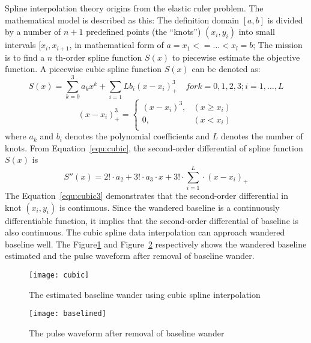Spline interpolation theory origins from the elastic ruler problem.
The mathematical model is described as this: The definition domain
$[a, b]$ is divided by a number of $n+1$ predefined points (the
``knots'') $(x_i, y_i)$ into small intervals $[x_i, x_{i+1}$, in
mathematical form of
$a=x_1<=\ldots<x_l=b$; The mission is to find a $n$ th-order spline
function $S(x)$ to piecewise estimate the objective function. A
piecewise cubic spline function $S(x)$ can be denoted as:
\begin{equation}
    S(x)=\sum_{k=0}^{3} a_k x^k + \sum_{i=1}{L} b_i
    (x-x_i)_{+}^{3} \quad for k=0,1,2,3; i=1,\ldots,L 
    \label{equ:cubic}
\end{equation}
\begin{equation}
    (x-x_i)_{+}^{3} = \left\{
    \begin{array}{ll}
        (x-x_i)^3, & (x \geq x_i)\\
        0, & (x<x_i)\\
    \end{array} \right.
    \label{equ:cubic2}
\end{equation}
where $a_k$ and $b_i$ denotes the polynomial coefficients and $L$
denotes the number of knots. From Equation~\ref{equ:cubic}, the
second-order differential of spline function $S(x)$ is 
\begin{equation}
    S''(x) = 2! \cdot a_2 + 3! \cdot a_3 \cdot x + 3! \cdot
    \sum_{i=1}^{L} \cdot (x-x_i)_{+}
    \label{equ:cubic3}
\end{equation}
The Equation~\ref{equ:cubic3} demonstrates that the second-order
differential in knot $(x_i, y_i)$ is continuous. Since the wandered baseline
is a continuously differentiable function, it implies that the
second-order differential of baseline is also continuous. The cubic
spline data interpolation can approach wandered baseline well. 
The Figure\ref{fig:estbaseline} and Figure~\ref{fig:baselined} respectively shows the wandered
baseline estimated and the pulse waveform after removal of baseline wander.
\begin{figure}[htpb]
    \begin{center}
        \texttt{[image: cubic]}
    \end{center}
    \caption{The estimated baseline wander using cubic spline interpolation}
    \label{fig:estbaseline}
\end{figure}
\begin{figure}[htpb]
    \begin{center}
        \texttt{[image: baselined]}
    \end{center}
    \caption{The pulse waveform after removal of baseline wander}
    \label{fig:baselined}
\end{figure}

